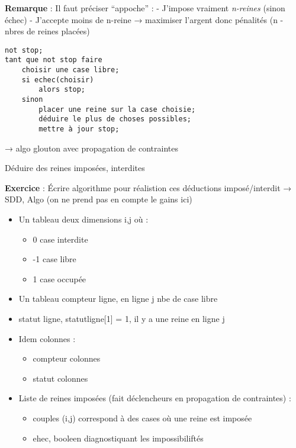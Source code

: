 \documentclass[]{article}
\begin{document}
\textbf{Remarque} : Il faut préciser ``appoche'' : - J'impose vraiment
\emph{n-reines} (sinon échec) - J'accepte moins de n-reine → maximiser
l'argent donc pénalités (n - nbres de reines placées)

\begin{verbatim}
not stop;
tant que not stop faire
    choisir une case libre;
    si echec(choisir)
        alors stop;
    sinon
        placer une reine sur la case choisie;
        déduire le plus de choses possibles;
        mettre à jour stop;
\end{verbatim}

→ algo glouton avec propagation de contraintes

Déduire des reines imposées, interdites

\textbf{Exercice} : Écrire algorithme pour réalistion ces déductions
imposé/interdit → SDD, Algo (on ne prend pas en compte le gains ici)

\begin{itemize}
\tightlist
\item
  Un tableau deux dimensions i,j où :

  \begin{itemize}
  \tightlist
  \item
    0 case interdite
  \item
    -1 case libre
  \item
    1 case occupée
  \end{itemize}
\item
  Un tableau compteur ligne, en ligne j nbe de case libre
\item
  statut ligne, statutligne{[}1{]} = 1, il y a une reine en ligne j
\item
  Idem colonnes :

  \begin{itemize}
  \tightlist
  \item
    compteur colonnes
  \item
    statut colonnes
  \end{itemize}
\item
  Liste de reines imposées (fait déclencheurs en propagation de
  contraintes) :

  \begin{itemize}
  \tightlist
  \item
    couples (i,j) correspond à des cases où une reine est imposée
  \item
    ehec, booleen diagnostiquant les impossibiliftés
  \end{itemize}
\end{itemize}
\end{document}

